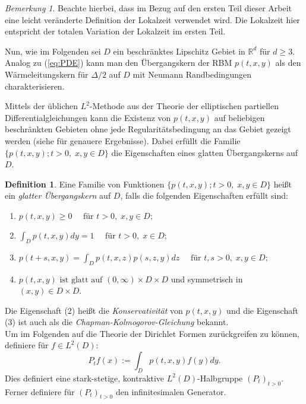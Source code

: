 \documentclass[10pt, a4paper, leqno, twoside, bibliography=totocnumbered, final]{scrartcl}
\theoremstyle{definition}
\newtheorem{defin}{Definition}[section]
\theoremstyle{plain}%
\theoremstyle{remark}
\newtheorem*{bem}{Bemerkung}
\begin{document}
\begin{bem}
Beachte hierbei, dass im Bezug auf den ersten Teil dieser Arbeit eine leicht veränderte Definition der Lokalzeit verwendet wird. Die Lokalzeit hier entspricht der totalen Variation der Lokalzeit im ersten Teil.\\
\end{bem}


Nun, wie im Folgenden sei $ D $ ein beschränktes Lipschitz Gebiet in $ \mathbb{R}^d $ für $ d \geq 3 $. Analog zu (\ref{eq:PDE}) kann man den Übergangskern der RBM $ p(t,x,y) $ als den Wärmeleitungskern für $  \Delta /2 $ auf $ D $ mit Neumann Randbedingungen charakterisieren.

Mittels der üblichen $ L^2 $-Methode aus der Theorie der elliptischen partiellen Differentialgleichungen kann die Existenz von $ p(t,x,y) $ auf beliebigen beschränkten Gebieten ohne jede Regularitätsbedingung an das Gebiet gezeigt werden (siehe  \cite{Gilbarg-Trudinger} für genauere Ergebnisse). Dabei erfüllt die Familie $ \{ p(t,x,y); t >0, \; x,y \in D  \} $ die Eigenschaften eines glatten Übergangskerns auf $ D $.

\begin{defin}
Eine Familie von Funktionen $ \{ p(t,x,y); t >0, \; x,y \in D  \} $ heißt ein \emph{glatter Übergangskern} auf $ D $, falls die folgenden Eigenschaften erfüllt sind:

\begin{enumerate}
\item[(1)] $ p(t,x,y) \geq 0 \quad \text{ für } t>0, \; x,y \in D; $
\item[(2)] $ \int_D p(t,x,y) dy = 1 \quad \text{ für } t>0, \; x \in D; $
\item[(3)] $ p(t+s,x,y) = \int_D p(t,x,z)p(s,z,y) dz \quad \text{ für } t,s>0, \; x,y \in D; $
\item[(4)] $ p(t,x,y) \text{ ist glatt auf } (0, \infty) \times D \times D $ und symmetrisch in $ (x,y) \in D \times D $.
\end{enumerate}
\end{defin}

Die Eigenschaft (2) heißt die \emph{Konservativität} von $ p(t,x,y) $ und die Eigenschaft (3) ist auch als die \emph{Chapman-Kolmogorov-Gleichung} bekannt.\\

Um im Folgenden auf die Theorie der Dirichlet Formen zurückgreifen zu können, definiere für $ f \in L^2(D) $:
\begin{equation}
\label{eq:Halbgruppe-Definition}
P_t f(x) := \int_D p(t,x,y) f (y) dy.
\end{equation}
Dies definiert eine stark-stetige, kontraktive $ L^2(D) $-Halbgruppe $ (P_t)_{t>0} $. Ferner definiere für $ (P_t)_{t>0} $ den infinitesimalen Generator.
\end{document}
